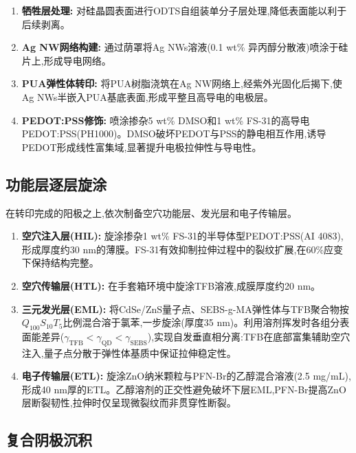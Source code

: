 \documentclass[12pt,a4paper]{article}
\begin{document}
\begin{enumerate}
    \item \textbf{牺牲层处理:} 对硅晶圆表面进行ODTS自组装单分子层处理,降低表面能以利于后续剥离。
    
    \item \textbf{Ag NW网络构建:} 通过荫罩将Ag NWs溶液(0.1 wt\% 异丙醇分散液)喷涂于硅片上,形成导电网络。
    
    \item \textbf{PUA弹性体转印:} 将PUA树脂浇筑在Ag NW网络上,经紫外光固化后揭下,使Ag NWs半嵌入PUA基底表面,形成平整且高导电的电极层。
    
    \item \textbf{PEDOT:PSS修饰:} 喷涂掺杂5 wt\% DMSO和1 wt\% FS-31的高导电PEDOT:PSS(PH1000)。DMSO破坏PEDOT与PSS的静电相互作用,诱导PEDOT形成线性富集域,显著提升电极拉伸性与导电性\cite{kim2024intrinsically}。
\end{enumerate}

\subsection{功能层逐层旋涂}

在转印完成的阳极之上,依次制备空穴功能层、发光层和电子传输层\cite{kim2024intrinsically}。

\begin{enumerate}
    \item \textbf{空穴注入层(HIL):} 旋涂掺杂1 wt\% FS-31的半导体型PEDOT:PSS(AI 4083),形成厚度约30 nm的薄膜。FS-31有效抑制拉伸过程中的裂纹扩展,在60\%应变下保持结构完整。
    
    \item \textbf{空穴传输层(HTL):} 在手套箱环境中旋涂TFB溶液,成膜厚度约20 nm。
    
    \item \textbf{三元发光层(EML):} 将CdSe/ZnS量子点、SEBS-g-MA弹性体与TFB聚合物按$Q_{100}S_{10}T_{5}$比例混合溶于氯苯,一步旋涂(厚度35 nm)。利用溶剂挥发时各组分表面能差异($\gamma_{\text{TFB}} < \gamma_{\text{QD}} < \gamma_{\text{SEBS}}$),实现自发垂直相分离:TFB在底部富集辅助空穴注入,量子点分散于弹性体基质中保证拉伸稳定性。
    
    \item \textbf{电子传输层(ETL):} 旋涂ZnO纳米颗粒与PFN-Br的乙醇混合溶液(2.5 mg/mL),形成40 nm厚的ETL。乙醇溶剂的正交性避免破坏下层EML,PFN-Br提高ZnO层断裂韧性,拉伸时仅呈现微裂纹而非贯穿性断裂。
\end{enumerate}

\subsection{复合阴极沉积}
\end{document}
